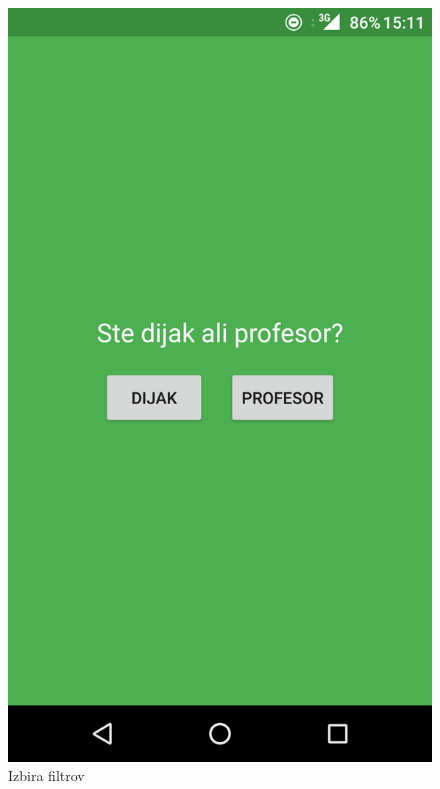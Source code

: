 \begin{figure}[!htb]
  \includegraphics[width=\linewidth]{images/filters.png}
  \caption{Izbira filtrov}\label{fig:filters_activity}
\endminipage
\end{figure}
